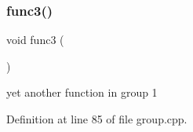 \subsubsection{\texorpdfstring{func3()}{func3()}}
{\footnotesize\ttfamily void func3 (\begin{DoxyParamCaption}{ }\end{DoxyParamCaption})}



yet another function in group 1 



Definition at line 85 of file group.\+cpp.


\begin{DoxyCode}{0}

\end{DoxyCode}
